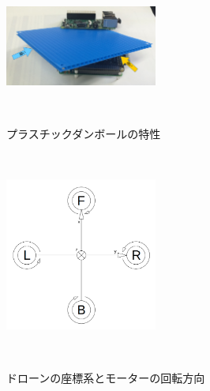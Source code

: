 \documentclass[a4paper]{jarticle}
\begin{document}
\begin{figure}[b]
 \begin{center}
  \includegraphics[width=50mm]{image/cardboard.png}
 　\caption{プラスチックダンボールの特性}
 　\label{fig:cardboard}
 \end{center}
\end{figure}


\begin{figure}[b]
 \begin{center}
  \includegraphics[width=50mm]{image/dronemotor.png}
 　\caption{ドローンの座標系とモーターの回転方向}
 　\label{fig:dronemotor}
 \end{center}
\end{figure}

\end{document}
